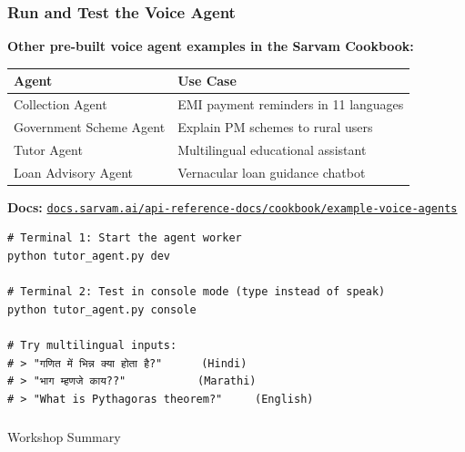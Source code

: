 \begin{frame}[fragile]\frametitle{Run and Test the Voice Agent}
\textbf{Other pre-built voice agent examples in the Sarvam Cookbook:}
\begin{center}
\begin{tabular}{|p{3cm}|p{3cm}|}
\hline
\textbf{Agent} & \textbf{Use Case} \\
\hline
Collection Agent & EMI payment reminders in 11 languages \\
Government Scheme Agent & Explain PM schemes to rural users \\
Tutor Agent & Multilingual educational assistant \\
Loan Advisory Agent & Vernacular loan guidance chatbot \\
\hline
\end{tabular}
\end{center}

\textbf{Docs:} \href{https://docs.sarvam.ai/api-reference-docs/cookbook/example-voice-agents/collection-agent}{\small\texttt{docs.sarvam.ai/api-reference-docs/cookbook/example-voice-agents}}
\begin{lstlisting}
# Terminal 1: Start the agent worker
python tutor_agent.py dev

# Terminal 2: Test in console mode (type instead of speak)
python tutor_agent.py console

# Try multilingual inputs:
# > "गणित में भिन्न क्या होता है?"      (Hindi)
# > "भाग म्हणजे काय??"           (Marathi)
# > "What is Pythagoras theorem?"     (English)
\end{lstlisting}
\end{frame}


\begin{frame}[fragile]\frametitle{}
\begin{center}
{\Large Workshop Summary}
\end{center}
\end{frame}

